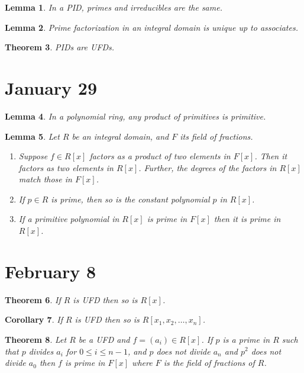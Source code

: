 \documentclass[letterpaper]{article}
\newtheorem{theorem}{Theorem}[section]
\newtheorem{lemma}[theorem]{Lemma}
\newtheorem{corollary}[theorem]{Corollary}
\begin{document}
\begin{lemma}
In a PID, primes and irreducibles are the same.
\end{lemma}

\begin{lemma}
Prime factorization in an integral domain is unique up to associates.
\end{lemma}

\begin{theorem}
PIDs are UFDs.
\end{theorem}

\section{January 29}

\begin{lemma}
In a polynomial ring, any product of primitives is primitive.
\end{lemma}

\begin{lemma}
Let $R$ be an integral domain, and $F$ its field of fractions.
\begin{enumerate}
\item Suppose $f \in R[x]$ factors as a product of two elements in $F[x]$. Then it factors as two  elements in $R[x]$. Further, the degrees of the factors in $R[x]$ match those in $F[x]$.
\item If $p \in R$ is prime, then so is the constant polynomial $p$ in $R[x]$.
\item If a primitive polynomial in $R[x]$ is prime in $F[x]$ then it is prime in $R[x]$.
\end{enumerate}
\end{lemma}

\section{February 8}

\begin{theorem}
If $R$ is UFD then so is $R[x]$.
\end{theorem}

\begin{corollary}
If $R$ is UFD then so is $R[x_1, x_2, \ldots, x_n]$.
\end{corollary}

\begin{theorem}
Let $R$ be a UFD and $f = (a_i) \in R[x]$. If $p$ is a prime in $R$ such that $p$ divides $a_i$ for $0 \leq i \leq n-1$, and $p$ does not divide $a_n$ and $p^2$ does not divide $a_0$ then $f$ is prime in $F[x]$ where $F$ is the field of fractions of $R$.
\end{theorem}
\end{document}
